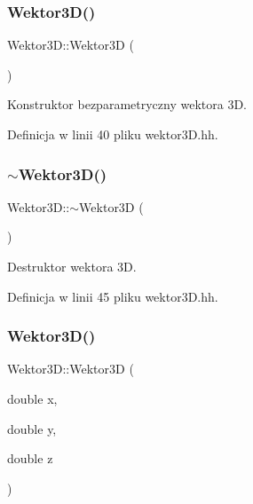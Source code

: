 \subsubsection{\texorpdfstring{Wektor3\+D()}{Wektor3D()}\hspace{0.1cm}{\footnotesize\ttfamily [1/5]}}
{\footnotesize\ttfamily Wektor3\+D\+::\+Wektor3D (\begin{DoxyParamCaption}{ }\end{DoxyParamCaption})\hspace{0.3cm}{\ttfamily [inline]}}



Konstruktor bezparametryczny wektora 3D. 



Definicja w linii 40 pliku wektor3\+D.\+hh.

\mbox{\label{class_wektor3_d_af82ae24a30f6c4391edd67647348ac04}} 
\subsubsection{\texorpdfstring{$\sim$\+Wektor3\+D()}{~Wektor3D()}}
{\footnotesize\ttfamily Wektor3\+D\+::$\sim$\+Wektor3D (\begin{DoxyParamCaption}{ }\end{DoxyParamCaption})\hspace{0.3cm}{\ttfamily [inline]}}



Destruktor wektora 3D. 



Definicja w linii 45 pliku wektor3\+D.\+hh.

\mbox{\label{class_wektor3_d_a0defc77d38b1c9f9b1063d2b3459de5c}} 
\subsubsection{\texorpdfstring{Wektor3\+D()}{Wektor3D()}\hspace{0.1cm}{\footnotesize\ttfamily [2/5]}}
{\footnotesize\ttfamily Wektor3\+D\+::\+Wektor3D (\begin{DoxyParamCaption}\item[{double}]{x,  }\item[{double}]{y,  }\item[{double}]{z }\end{DoxyParamCaption})\hspace{0.3cm}{\ttfamily [inline]}}



